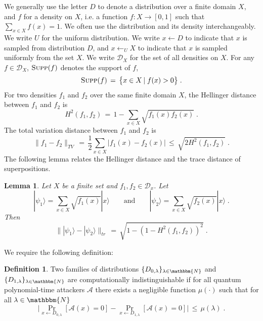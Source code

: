 \documentclass[11pt]{article}
\newtheorem{lemma}[theorem]{Lemma}
\theoremstyle{remark}
\theoremstyle{definition}
\newtheorem{definition}[theorem]{Definition}
\newcommand{\ket}[1]{|#1\rangle}
\newcommand{\supp}{\textsc{Supp}}
\newcommand{\mN}{\mathbbm{N}}
\begin{document}
We generally use the letter $D$ to denote a distribution over a finite domain $X$, and $f$ for a density on $X$, i.e. a function $f:X\to[0,1]$ such that $\sum_{x\in X} f(x)=1$. We often use the distribution and its density interchangeably. We write $U$ for the uniform distribution. We write $x\leftarrow D$ to indicate that $x$ is sampled from distribution $D$, and $x\leftarrow_U X$ to indicate that $x$ is sampled uniformly from the set $X$. 
We write $\mathcal{D}_X$ for the set of all densities on $X$.
For any $f\in\mathcal{D}_X$, $\supp(f)$ denotes the support of $f$,
\begin{equation*}
    \supp(f) \,=\, \big\{x\in X \,|\; f(x)> 0\big\}\;.
\end{equation*}
For two densities $f_1$ and $f_2$ over the same finite domain $X$, the Hellinger distance  between $f_1$ and $f_2$ is
\begin{equation}\label{eq:bhatt}
H^2(f_1,f_2) \,=\, 1- \sum_{x\in X}\sqrt{f_1(x)f_2(x)}\;.
\end{equation}
The total variation distance between $f_1$ and $f_2$ is
\begin{equation}\label{eq:stattobhatt}
\|f_1-f_2\|_{TV} \,=\, \frac{1}{2} \sum_{x\in X}|f_1(x) - f_2(x)| \,\leq\, \sqrt{2H^2(f_1,f_2)}\;.
\end{equation}
The following lemma relates the Hellinger distance and the trace distance of superpositions. 
\begin{lemma}
Let $X$ be a finite set and $f_1,f_2\in\mathcal{D}_x$. Let 
$$ \ket{\psi_1}=\sum_{x\in X}\sqrt{f_1(x)}\ket{x}\qquad\text{and}\qquad  \ket{\psi_2}=\sum_{x\in X}\sqrt{f_2(x)}\ket{x}\;.$$
 Then 
 $$\|\ket{\psi_1}-\ket{\psi_2}\|_{tr}\,=\, \sqrt{ 1 - (1-H^2(f_1,f_2))^2}\;.$$
\end{lemma}
We require the following definition:
\begin{definition}\label{def:compinddist}
Two families of distributions $\{D_{0,\lambda}\}_{\lambda\in\mN}$ and $\{D_{1,\lambda}\}_{\lambda\in\mN}$ are computationally indistinguishable if for all quantum polynomial-time attackers $\mathcal{A}$ there exists a negligible function $\mu(\cdot)$ such that for all $\lambda\in\mN$
\begin{equation}
\Big|\Pr_{x\leftarrow D_{0,\lambda}}[\mathcal{A}(x) = 0] - \Pr_{x\leftarrow D_{1,\lambda}}[\mathcal{A}(x) = 0]\Big| \,\leq\, \mu(\lambda)\;.
\end{equation}
\end{definition}
\end{document}
